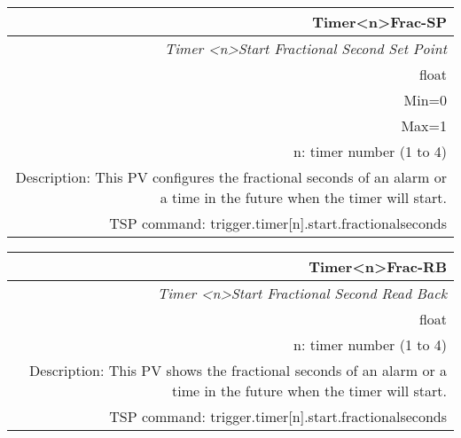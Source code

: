 \documentclass[openany]{article}
\begin{document}
		\begin{tabular}{N}
			\hline
			\bfseries Timer{\textless n\textgreater}Frac-SP\label{pv:timerfrac-sp} \\ \hline
			\emph{Timer \textless n\textgreater Start Fractional Second Set Point} \\
			float \\
			Min=0 \\
			Max=1 \\
			n: timer number (1 to 4) \\
			Description: This PV configures the fractional seconds of an alarm or a time in the future when the timer will start. \\
			TSP command: trigger.timer[n].start.fractionalseconds
		\end{tabular}

		\begin{tabular}{N}
			\hline
			\bfseries Timer{\textless n\textgreater}Frac-RB\label{pv:timerfrac-rb} \\ \hline
			\emph{Timer \textless n\textgreater Start Fractional Second Read Back} \\
			float \\
			n: timer number (1 to 4) \\
			Description: This PV shows the fractional seconds of an alarm or a time in the future when the timer will start. \\
			TSP command: trigger.timer[n].start.fractionalseconds
		\end{tabular}
\end{document}
